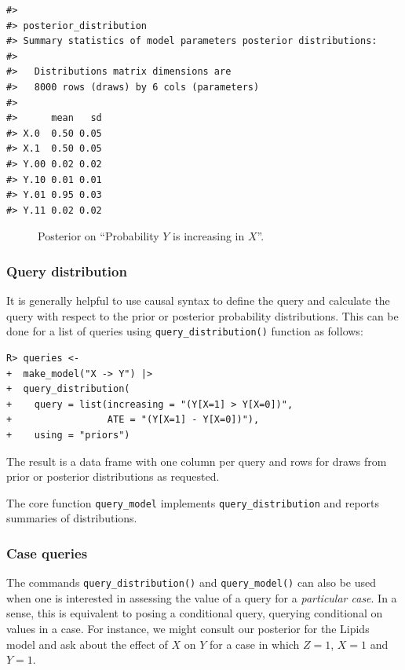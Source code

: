 \documentclass[
  11pt,
  article]{jss}
\begin{document}
\begin{verbatim}
#> 
#> posterior_distribution
#> Summary statistics of model parameters posterior distributions:
#> 
#>   Distributions matrix dimensions are 
#>   8000 rows (draws) by 6 cols (parameters)
#> 
#>      mean   sd
#> X.0  0.50 0.05
#> X.1  0.50 0.05
#> Y.00 0.02 0.02
#> Y.10 0.01 0.01
#> Y.01 0.95 0.03
#> Y.11 0.02 0.02
\end{verbatim}

\begin{figure}[t]


\caption{\label{fig-posterior-dist}Posterior on ``Probability \(Y\) is
increasing in \(X\)''.}

\end{figure}%

\FloatBarrier

\subsubsection{Query distribution}\label{query-distribution}

It is generally helpful to use causal syntax to define the query and
calculate the query with respect to the prior or posterior probability
distributions. This can be done for a list of queries using
\texttt{query\_distribution()} function as follows:

\begin{verbatim}
R> queries <- 
+  make_model("X -> Y") |> 
+  query_distribution(
+    query = list(increasing = "(Y[X=1] > Y[X=0])",
+                 ATE = "(Y[X=1] - Y[X=0])"), 
+    using = "priors")
\end{verbatim}

The result is a data frame with one column per query and rows for draws
from prior or posterior distributions as requested.

The core function \texttt{query\_model} implements
\texttt{query\_distribution} and reports summaries of distributions.

\subsubsection{Case queries}\label{case-queries}

The commands \texttt{query\_distribution()} and \texttt{query\_model()}
can also be used when one is interested in assessing the value of a
query for a \emph{particular case}. In a sense, this is equivalent to
posing a conditional query, querying conditional on values in a case.
For instance, we might consult our posterior for the Lipids model and
ask about the effect of \(X\) on \(Y\) for a case in which \(Z=1\),
\(X=1\) and \(Y=1\).
\end{document}
